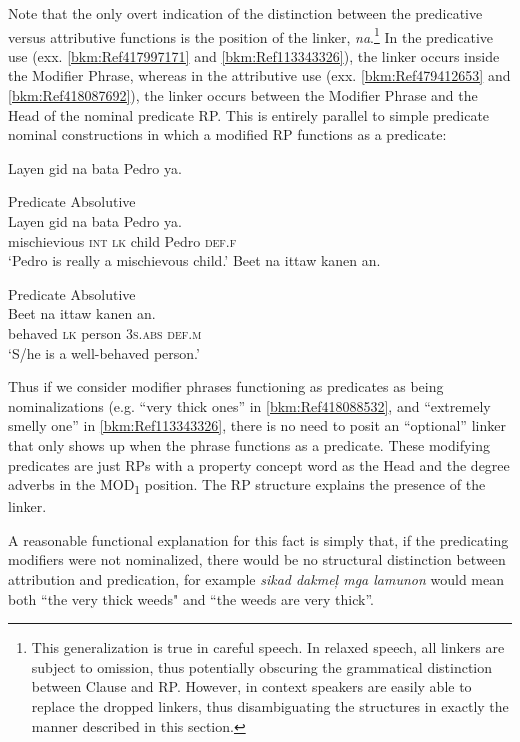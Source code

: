 Note that the only overt indication of the distinction between the predicative versus attributive functions is the position of the linker, \textit{na}.\footnote{This generalization is true in careful speech. In relaxed speech, all linkers are subject to omission, thus potentially obscuring the grammatical distinction between Clause and RP. However, in context speakers are easily able to replace the dropped linkers, thus disambiguating the structures in exactly the manner described in this section.} In the predicative use (exx. \ref{bkm:Ref417997171} and \ref{bkm:Ref113343326}), the linker occurs inside the Modifier Phrase, whereas in the attributive use (exx. \ref{bkm:Ref479412653} and \ref{bkm:Ref418087692}), the linker occurs between the Modifier Phrase and the Head of the nominal predicate RP. This is entirely parallel to simple predicate nominal constructions in which a modified RP functions as a predicate:

\ea
Layen  gid  na  bata  Pedro  ya. \\\smallskip

Predicate \hspace{70pt} Absolutive \\\smallskip
 \gll Layen  gid  na  bata  Pedro  ya. \\
mischievious  \textsc{int}  \textsc{lk}  child  Pedro  \textsc{def.f} \\
\glt ‘Pedro is really a mischievous child.’
\z
\ea
Beet  na  ittaw    kanen  an. \\\smallskip

Predicate \hspace{40pt}   Absolutive \\\smallskip
 \gll Beet  na  ittaw    kanen  an. \\
behaved  \textsc{lk}  person  3\textsc{s.abs}  \textsc{def.m} \\
\glt ‘S/he is a well-behaved person.’
\z

\largerpage
Thus if we consider modifier phrases functioning as predicates as being nominalizations (e.g. “very thick ones” in \ref{bkm:Ref418088532}, and “extremely smelly one” in \ref{bkm:Ref113343326}, there is no need to posit an “optional” linker that only shows up when the phrase functions as a predicate. These modifying predicates are just RPs with a property concept word as the Head and the degree adverbs in the MOD\textsubscript{1} position. The RP structure explains the presence of the linker.

A reasonable functional explanation for this fact is simply that, if the predicating modifiers were not nominalized, there would be no structural distinction between attribution and predication, for example \textit{sikad dakmeļ mga lamunon} would mean both “the very thick weeds" and “the weeds are very thick”.

